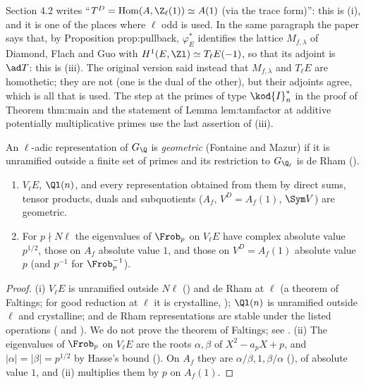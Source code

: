 \begin{paperlink}
Section 4.2 writes ``$T^D=\operatorname{Hom}(A,\Z_\ell(1))\simeq A(1)$ (via the trace form)'': this is (i), and it is one of the places where $\ell$ odd is
used. In the same paragraph the paper says that, by Proposition prop:pullback, $\varphi_E^*$ identifies the lattice $M_{f,\lambda}$ of Diamond,
Flach and Guo with $H^1(E,\Zl)\simeq T_\ell E(-1)$, so that its adjoint is $\ad T$: this is (iii). The original version said instead that $M_{f,\lambda}$ and $T_\ell E$ are homothetic;
they are not (one is the dual of the other), but their adjoints agree, which is all that is used. The step at the primes of type
$\kod{I}_n^*$ in the proof of Theorem thm:main and the statement of Lemma lem:tamfactor at additive potentially multiplicative primes use the
last assertion of (iii).
\end{paperlink}

\begin{definition}\label{def:blochkato:geometric}
An $\ell$-adic representation of $G_\Q$ is \emph{geometric} (Fontaine and Mazur) if it is unramified outside a finite set of primes and its restriction
to $G_{\Q_\ell}$ is de Rham ().
\end{definition}

\begin{proposition}\label{prop:blochkato:purity}
\begin{enumerate}[label=(\roman*)]
\item $V_\ell E$, $\Ql(n)$, and every representation obtained from them by direct sums, tensor products, duals and subquotients ($A_f$, $V^D=A_f(1)$,
$\Sym V$) are geometric.
\item For $p\nmid N\ell$ the eigenvalues of $\Frob_p$ on $V_\ell E$ have complex absolute value $p^{1/2}$, those on $A_f$ absolute value $1$, and those on
$V^D=A_f(1)$ absolute value $p$ (and $p^{-1}$ for $\Frob_p^{-1}$).
\end{enumerate}
\end{proposition}

\begin{proof}
(i) $V_\ell E$ is unramified outside $N\ell$ () and de Rham at $\ell$ (a theorem of Faltings; for good reduction at $\ell$ it is crystalline,
); $\Ql(n)$ is unramified outside $\ell$ and crystalline; and de Rham representations are stable under the
listed operations ( and \cite{Berger}). We do not prove the theorem of Faltings; see \cite{Berger}. (ii) The
eigenvalues of $\Frob_p$ on $V_\ell E$ are the roots $\alpha,\beta$ of $X^2-a_pX+p$, and $|\alpha|=|\beta|=p^{1/2}$ by Hasse's bound (). On $A_f$ they
are $\alpha/\beta,1,\beta/\alpha$ (), of absolute value $1$, and (ii) multiplies them by $p$ on $A_f(1)$.
\end{proof}

